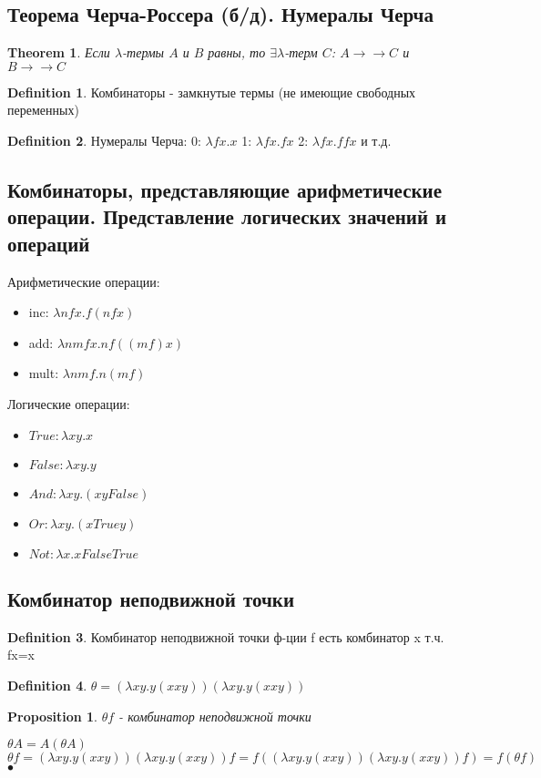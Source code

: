 \documentclass[a4paper]{article}
\theoremstyle{plain}
\newtheorem{theorem}{Theorem}
\newtheorem{proposition}{Proposition}
\theoremstyle{remark}
\theoremstyle{definition}
\newtheorem{definition}{Definition}
\renewenvironment{proof}{{\bfseries Proof}}{$\bullet$}
\begin{document}
\subsection{Теорема Черча-Россера (б/д). Нумералы Черча}
\begin{theorem}
Если $\lambda$-термы $A$ и $B$ равны, то $\exists \lambda$-терм $C$: $A\rightarrow\rightarrow C$ и $B\rightarrow\rightarrow C$  	
\end{theorem}
\begin{definition}
Комбинаторы - замкнутые термы (не имеющие свободных переменных)	
\end{definition}
\begin{definition}
Нумералы Черча: 0: $\lambda fx.x$  1: $\lambda fx.fx$  2: $\lambda fx.ffx$ и т.д.	
\end{definition}
\subsection{Комбинаторы, представляющие арифметические операции. Представление логических значений и операций}
Арифметические операции:
\begin{itemize}
	\item inc: $\lambda nfx.f(nfx)$
	\item add: $\lambda nmfx.nf((mf)x)$
	\item mult: $\lambda nmf. n(mf)$
\end{itemize}
Логические операции:
\begin{itemize}
	\item $True: \lambda xy.x$
	\item $False: \lambda xy.y$
	\item $And: \lambda xy.(xyFalse)$
	\item $Or: \lambda xy.(xTruey)$
	\item $Not: \lambda x.xFalseTrue$
\end{itemize}
\subsection{Комбинатор неподвижной точки}
\begin{definition}
Комбинатор неподвижной точки ф-ции f есть комбинатор x т.ч. fx=x	
\end{definition}
\begin{definition}
$\theta = (\lambda xy.y(xxy))(\lambda xy.y(xxy))$\\
\end{definition}
\begin{proposition}
$\theta f$ - комбинатор неподвижной точки	
\end{proposition}
\begin{proof}
$\theta A = A(\theta A)$\\
$\theta f = (\lambda xy.y(xxy))(\lambda xy.y(xxy))f = f((\lambda xy.y(xxy))(\lambda xy.y(xxy))f)=f(\theta f)$
\end{proof}
\end{document}

